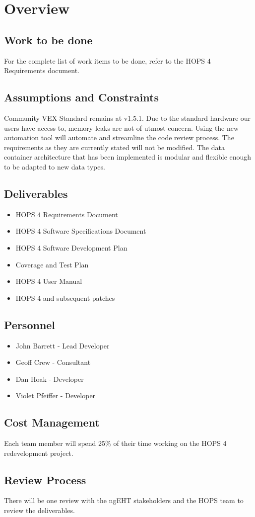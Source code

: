%
%
\section{Overview}
\label{sec:overview}
\subsection{Work to be done}
For the complete list of work items to be done, refer to the HOPS 4 Requirements document.
\subsection{Assumptions and Constraints}
Community VEX Standard remains at v1.5.1.
Due to the standard hardware our users have access to, memory leaks are not of utmost concern. 
Using the new automation tool will automate and streamline the code review process.
The requirements as they are currently stated will not be modified.
The data container architecture that has been implemented is modular and flexible enough to be adapted to new data types.

\subsection{Deliverables}
\begin{itemize}
\item HOPS 4 Requirements Document
\item HOPS 4 Software Specifications Document
\item HOPS 4 Software Development Plan
\item Coverage and Test Plan
\item HOPS 4 User Manual
\item HOPS 4 and subsequent patches
\end{itemize}

\subsection{Personnel}
\begin{itemize}
\item John Barrett - Lead Developer
\item Geoff Crew - Consultant
\item Dan Hoak - Developer
\item Violet Pfeiffer - Developer
\end{itemize}

\subsection{Cost Management}
Each team member will spend 25\% of their time working on the HOPS 4 redevelopment project.

\subsection{Review Process}
There will be one review with the ngEHT stakeholders and the HOPS team to review the deliverables.
%
%
